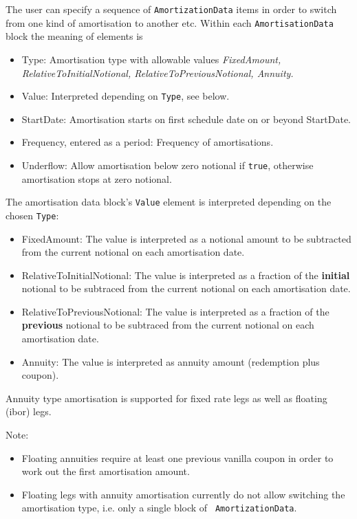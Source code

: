 The user can specify a sequence of {\tt AmortizationData} items in
order to switch from one kind of amortisation to another etc.  
Within each {\tt AmortisationData} block the meaning of elements is

\begin{itemize}
\item Type: Amortisation type with allowable values {\em FixedAmount,
  RelativeToInitialNotional, RelativeToPreviousNotional, Annuity.}
\item Value: Interpreted depending on {\tt Type}, see below.
\item StartDate: Amortisation starts on first schedule date on or
  beyond StartDate.
\item Frequency, entered as a period: Frequency of amortisations.
\item Underflow:  Allow amortisation below zero notional if {\tt true},
  otherwise amortisation stops at zero notional.
\end{itemize}

The amortisation data block's {\tt Value} element  is interpreted
depending on the chosen {\tt Type}:
\begin{itemize}
\item FixedAmount: The value is interpreted as a notional amount to be
  subtracted from the current notional on each amortisation date.
\item RelativeToInitialNotional: The value is interpreted as a
  fraction of the {\bf initial} notional to be subtraced from the current
  notional on each amortisation date.
\item RelativeToPreviousNotional: The value is interpreted as a
  fraction of the {\bf previous} notional to be subtraced from the current
  notional on each amortisation date.
\item Annuity: The value is interpreted as annuity amount (redemption
  plus coupon).
\end{itemize}

Annuity type amortisation is supported for fixed rate legs as well as
floating (ibor) legs. 

Note:
\begin{itemize}
\item Floating annuities require at least one previous vanilla coupon
  in order to work out the first amortisation amount. 
\item Floating legs with annuity amortisation currently do not allow
  switching the amortisation type, i.e. only a  single block of {\tt
    AmortizationData}.
\end{itemize}

